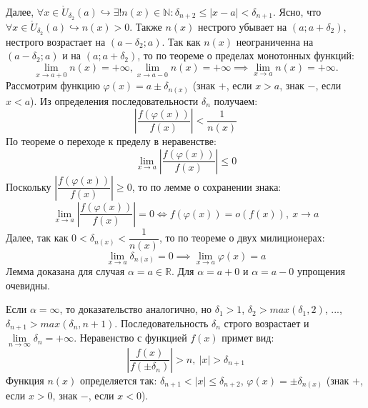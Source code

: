 \documentclass[12pt, a4paper, reqno]{article}
\begin{document}
    Далее, $\forall x \in \mathring U_{\delta_2}(a) \hookrightarrow \exists! n(x)\in\mathbb{N}:
    \delta_{n + 2}\leq |x - a| < \delta_{n + 1}$. Ясно, что $\forall x \in \mathring U_{\delta_2}(a)
    \hookrightarrow n(x)  > 0$. Также $n(x)$ нестрого убывает на $(a; a + \delta_2)$, нестрого
    возрастает на $(a - \delta_2; a)$. Так как $n(x)$ неограниченна на $(a - \delta_2; a)$ и на
    $(a; a + \delta_2)$, то по теореме о пределах монотонных функций:
    \begin{equation*}
        \lim\limits_{x\to a+0} n(x) = +\infty, \lim\limits_{x\to a-0} n(x) = +\infty \implies
        \lim\limits_{x\to a} n(x) = +\infty.
    \end{equation*}
    Рассмотрим функцию $\varphi(x) = a\pm \delta_{n(x)}$ (знак $+$, если $x > a$, знак $-$, если
    $x < a$). Из определения последовательности $\delta_n$ получаем:
    \begin{equation*}
        \left|\dfrac{f(\varphi(x))}{f(x)}\right| < \dfrac{1}{n(x)}
    \end{equation*}
    По теореме о переходе к пределу в неравенстве:
    \begin{equation*}
        \lim\limits_{x\to a} \left|\dfrac{f(\varphi(x))}{f(x)}\right| \leq 0
    \end{equation*}
    Поскольку $\left|\dfrac{f(\varphi(x))}{f(x)}\right| \geq 0$, то по лемме о сохранении знака:
    \begin{equation*}
        \lim\limits_{x\to a} \left|\dfrac{f(\varphi(x))}{f(x)}\right| = 0 \iff
        f(\varphi(x)) = o(f(x)),\ x\to a
    \end{equation*}
    Далее, так как $0 < \delta_{n(x)} < \dfrac{1}{n(x)}$, то по теореме о двух милиционерах:
    \begin{equation*}
        \lim\limits_{x\to a} \delta_{n(x)} = 0 \implies \lim\limits_{x\to a} \varphi(x) = a
    \end{equation*}
    Лемма доказана для случая $\alpha = a\in\mathbb{R}$. Для $\alpha = a + 0$ и $\alpha = a - 0$
    упрощения очевидны.

    Если $\alpha = \infty$, то доказательство аналогично, но $\delta_1 > 1$,
    $\delta_2 > max(\delta_1, 2)$, ..., $\delta_{n + 1} > max(\delta_n, n + 1)$. Последовательность
    $\delta_n$ строго возрастает и $\lim\limits_{n\to\infty}\delta_n = +\infty$. Неравенство с
    функцией $f(x)$ примет вид:
    \begin{equation*}
        \left|\dfrac{f(x)}{f(\pm\delta_n)}\right| > n,\ |x| > \delta_{n + 1}
    \end{equation*}
    Функция $n(x)$ определяется так: $\delta_{n + 1} < |x| \leq \delta_{n + 2}$,
    $\varphi(x) = \pm\delta_{n(x)}$ (знак $+$, если $x > 0$, знак $-$, если $x < 0$).
\end{document}

